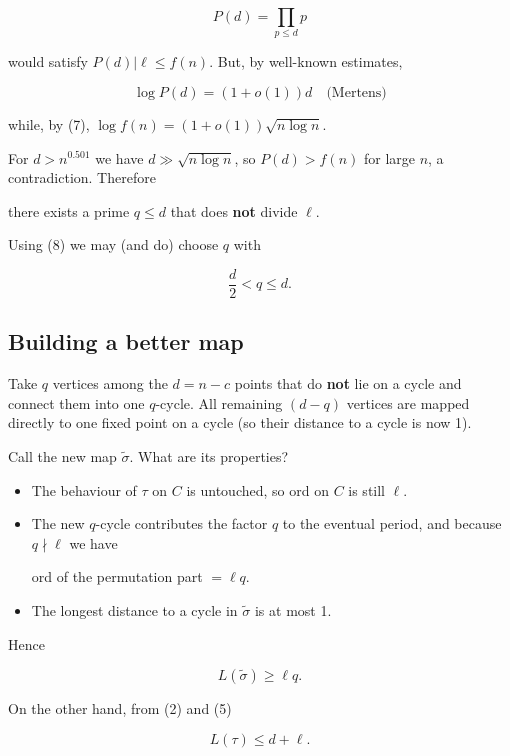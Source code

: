\documentclass[12pt,a4paper]{article}
\theoremstyle{definition}
\begin{document}
    $$P(d) = \prod_{p \leq d} p$$

    would satisfy $P(d) | \ell \leq f(n)$.
    But, by well-known estimates,

    $$\log P(d) = (1 + o(1)) d \quad \text{(Mertens)}$$

    while, by (7), $\log f(n) = (1 + o(1))\sqrt{n \log n}$.

    For $d > n^{0.501}$ we have $d \gg \sqrt{n \log n}$, so $P(d) > f(n)$ for large $n$,
    a contradiction. Therefore

    there exists a prime $q \leq d$ that does \textbf{not} divide $\ell$.

    Using (8) we may (and do) choose $q$ with

    \begin{equation}
        \frac{d}{2} < q \leq d.
    \end{equation}

    \subsection*{Building a better map}

    Take $q$ vertices among the $d = n - c$ points that do \textbf{not} lie on a
    cycle and connect them into one $q$-cycle.
    All remaining $(d - q)$ vertices are mapped directly to one fixed point on
    a cycle (so their distance to a cycle is now 1).

    Call the new map $\tilde{\sigma}$. What are its properties?

    \begin{itemize}
        \item The behaviour of $\tau$ on $C$ is untouched, so ord on $C$ is still $\ell$.
        \item The new $q$-cycle contributes the factor $q$ to the eventual period,
        and because $q \nmid \ell$ we have

        ord of the permutation part $= \ell q$.
        \item The longest distance to a cycle in $\tilde{\sigma}$ is at most 1.
    \end{itemize}

    Hence

    \begin{equation}
        L(\tilde{\sigma}) \geq \ell q.
    \end{equation}

    On the other hand, from (2) and (5)

    \begin{equation}
        L(\tau) \leq d + \ell.
    \end{equation}
\end{document}
